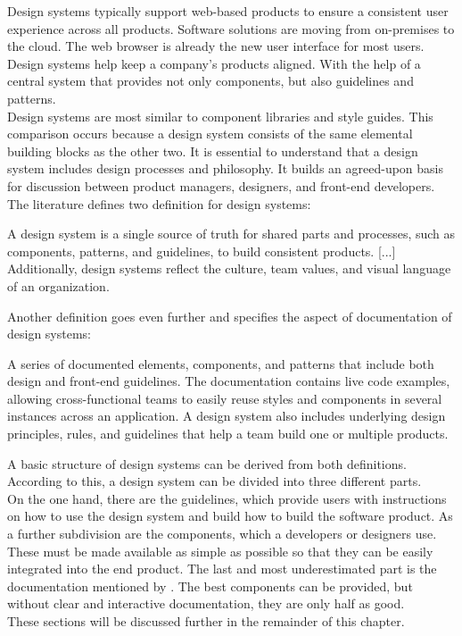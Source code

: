 Design systems typically support web-based products to ensure a consistent user experience across all products. Software solutions are moving from on-premises to the cloud. The web browser is already the new user interface for most users. Design systems help keep a company's products aligned. With the help of a central system that provides not only components, but also guidelines and patterns.  \citep{macdonald_practical_2019} \\
Design systems are most similar to component libraries and style guides. This comparison occurs because a design system consists of the same elemental building blocks as the other two. It is essential to understand that a design system includes design processes and philosophy. It builds an agreed-upon basis for discussion between product managers, designers, and front-end developers. \cite{vesselov_building_2019} \\
The literature defines two definition for design systems:
\begin{tcolorbox}[title=Definition of design system by \citet*{macdonald_practical_2019}]
A design system is a single source of truth for shared parts and processes, such as components, patterns, and guidelines, to build consistent products. [...] Additionally, design systems reflect the culture, team values, and visual language of an organization.
\end{tcolorbox}
Another definition goes even further and specifies the aspect of documentation of design systems:
\begin{tcolorbox}[title=Definition of design system by \citet*{vesselov_building_2019}]
A series of documented elements, components, and patterns that include both design and front-end guidelines. The documentation contains live code examples, allowing cross-functional teams to easily reuse styles and components in several instances across an application. A design system also includes underlying design principles, rules, and guidelines that help a team build one or multiple products.
\end{tcolorbox}
A basic structure of design systems can be derived from both definitions. According to this, a design system can be divided into three different parts.\\
On the one hand, there are the guidelines, which provide users with instructions on how to use the design system and build how to build the software product. As a further subdivision are the components, which a developers or designers use. These must be made available as simple as possible so that they can be easily integrated into the end product. The last and most underestimated part is the documentation mentioned by \citet*{vesselov_building_2019}. The best components can be provided, but without clear and interactive documentation, they are only half as good. \\
These sections will be discussed further in the remainder of this chapter. \cite{macdonald_practical_2019}\cite{vesselov_building_2019}

